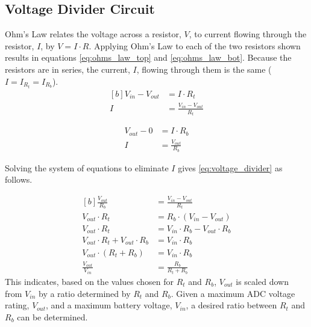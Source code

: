 \documentclass[main.tex]{subfiles}
\begin{document}
\subsection{Voltage Divider Circuit}
Ohm's Law relates the voltage across a resistor, $V$, to current flowing through the resistor, $I$, by $V = I \cdot R$. Applying Ohm's Law to each of the two resistors shown results in equations \eqref{eq:ohms_law_top} and \eqref{eq:ohms_law_bot}. Because the resistors are in series, the current, $I$, flowing through them is the same ($I = I_{R_t} = I_{R_b}$).
\begin{equation}
    \begin{aligned}[b]
        V_{in} - V_{out} &= I \cdot R_t \\
        I &= \frac{V_{in} - V_{out}}{R_t}
    \end{aligned}
    \label{eq:ohms_law_top}
\end{equation}

\begin{equation}
    \begin{aligned}
        V_{out} - 0 &= I \cdot R_b \\
        I &= \frac{V_{out}}{R_b}
    \end{aligned}
    \label{eq:ohms_law_bot}
\end{equation}

\noindent Solving the system of equations to eliminate $I$ gives \eqref{eq:voltage_divider} as follows. 

\begin{equation}
    \begin{aligned}[b]
        \frac{V_{out}}{R_b} &= \frac{V_{in} - V_{out}}{R_t} \\
        V_{out} \cdot R_t &= R_b \cdot (V_{in} - V_{out}) \\
        V_{out} \cdot R_t &= V_{in} \cdot R_b - V_{out} \cdot R_b \\
        V_{out} \cdot R_t + V_{out} \cdot R_b &= V_{in} \cdot R_b \\
        V_{out} \cdot (R_t + R_b) &= V_{in} \cdot R_b \\
        \frac{V_{out}}{V_{in}} &= \frac{R_b}{R_t + R_b}
    \end{aligned}
    \label{eq:voltage_divider}
\end{equation}
This indicates, based on the values chosen for $R_t$ and $R_b$, $V_{out}$ is scaled down from $V_{in}$ by a ratio determined by $R_t$ and $R_b$. Given a maximum ADC voltage rating, $V_{out}$, and a maximum battery voltage, $V_{in}$, a desired ratio between $R_t$ and $R_b$ can be determined. \newline
\end{document}
